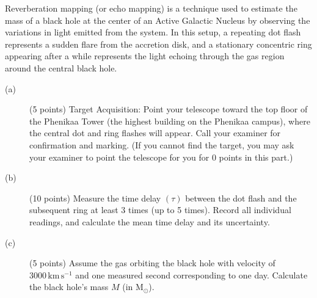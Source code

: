 Reverberation mapping (or echo mapping) is a technique used to estimate the
mass of a black hole at the center of an Active Galactic Nucleus by observing
the variations in light emitted from the system. In this setup, a repeating
dot flash represents a sudden flare from the accretion disk, and a stationary
concentric ring appearing after a while represents the light echoing through
the gas region around the central black hole.

\begin{description}
\item[(a)] (5 points) Target Acquisition: Point your telescope toward the top
  floor of the Phenikaa Tower (the highest building on the Phenikaa campus),
  where the central dot and ring flashes will appear. Call your examiner for
  confirmation and marking. (If you cannot find the target, you may ask your
  examiner to point the telescope for you for 0 points in this part.)
\item[(b)] (10 points) Measure the time delay $(\tau)$ between the dot flash
  and the subsequent ring at least 3 times (up to 5 times). Record all
  individual readings, and calculate the mean time delay and its uncertainty.
\item[(c)] (5 points) Assume the gas orbiting the black hole with velocity of
  $3000\,\mathrm{km\,s^{-1}}$ and one measured second corresponding to one
  day. Calculate the black hole's mass $M$ (in $\mathrm{M}_\odot$).
\end{description}
